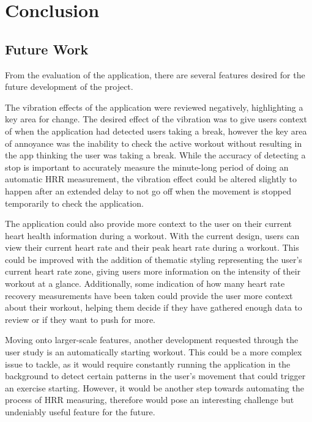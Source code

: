 \documentclass{l4proj}
\begin{document}
\chapter{Conclusion}    

\section{Future Work}

From the evaluation of the application, there are several features desired for the future development of the project. 

The vibration effects of the application were reviewed negatively, highlighting a key area for change. The desired effect of the vibration was to give users context of when the application had detected users taking a break, however the key area of annoyance was the inability to check the active workout without resulting in the app thinking the user was taking a break. While the accuracy of detecting a stop is important to accurately measure the minute-long period of doing an automatic HRR measurement, the vibration effect could be altered slightly to happen after an extended delay to not go off when the movement is stopped temporarily to check the application. 

The application could also provide more context to the user on their current heart health information during a workout. With the current design, users can view their current heart rate and their peak heart rate during a workout. This could be improved with the addition of thematic styling representing the user’s current heart rate zone, giving users more information on the intensity of their workout at a glance. Additionally, some indication of how many heart rate recovery measurements have been taken could provide the user more context about their workout, helping them decide if they have gathered enough data to review or if they want to push for more.

Moving onto larger-scale features, another development requested through the user study is an automatically starting workout. This could be a more complex issue to tackle, as it would require constantly running the application in the background to detect certain patterns in the user’s movement that could trigger an exercise starting. However, it would be another step towards automating the process of HRR measuring, therefore would pose an interesting challenge but undeniably useful feature for the future.
\end{document}
